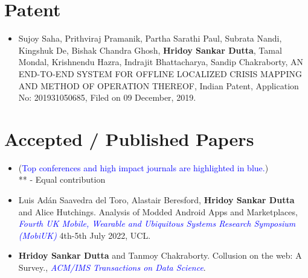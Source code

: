 \documentclass[margin, centered]{res}
\begin{document}
\begin{resume}
\section{Patent}
\begin{itemize}[leftmargin=*]

\item Sujoy Saha,  Prithviraj Pramanik,  Partha Sarathi Paul,  Subrata Nandi,  Kingshuk De,  Bishak Chandra Ghosh,  \textbf{Hridoy Sankar Dutta},  Tamal Mondal,  Krishnendu Hazra,  Indrajit Bhattacharya,  Sandip Chakraborty,  AN END-TO-END SYSTEM FOR OFFLINE LOCALIZED CRISIS MAPPING AND METHOD OF OPERATION THEREOF,  Indian Patent,  Application No: 201931050685,  Filed on 09 December, 2019.

\end{itemize}




\section{Accepted / Published Papers}
\begin{itemize}[leftmargin=*]
\item[] (\textcolor{blue}{Top conferences and high impact journals are highlighted in blue.}) \\ ** - Equal contribution

\item Luis Adán Saavedra del Toro,  Alastair Beresford,  \textbf{Hridoy Sankar Dutta} and Alice Hutchings. Analysis of Modded Android Apps and Marketplaces,  \textit{\textcolor{blue}{Fourth UK Mobile, Wearable and Ubiquitous Systems Research Symposium (MobiUK)}} 4th-5th July 2022, UCL.

\item \textbf{Hridoy Sankar Dutta} and Tanmoy Chakraborty. Collusion on the web: A Survey.,  \textit{\textcolor{blue}{ACM/IMS Transactions on Data Science}}.  


\end{itemize}
\end{resume}
\end{document}
